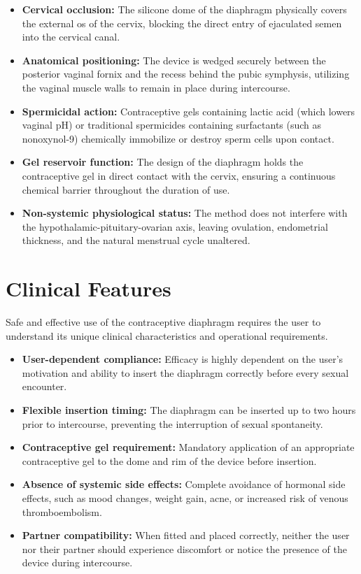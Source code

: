 \begin{itemize}
    \item \textbf{Cervical occlusion:} The silicone dome of the diaphragm physically covers the external os of the cervix, blocking the direct entry of ejaculated semen into the cervical canal.
    \item \textbf{Anatomical positioning:} The device is wedged securely between the posterior vaginal fornix and the recess behind the pubic symphysis, utilizing the vaginal muscle walls to remain in place during intercourse.
    \item \textbf{Spermicidal action:} Contraceptive gels containing lactic acid (which lowers vaginal pH) or traditional spermicides containing surfactants (such as nonoxynol-9) chemically immobilize or destroy sperm cells upon contact.
    \item \textbf{Gel reservoir function:} The design of the diaphragm holds the contraceptive gel in direct contact with the cervix, ensuring a continuous chemical barrier throughout the duration of use.
    \item \textbf{Non-systemic physiological status:} The method does not interfere with the hypothalamic-pituitary-ovarian axis, leaving ovulation, endometrial thickness, and the natural menstrual cycle unaltered.
\end{itemize}

\section*{Clinical Features}
Safe and effective use of the contraceptive diaphragm requires the user to understand its unique clinical characteristics and operational requirements.

\begin{itemize}
    \item \textbf{User-dependent compliance:} Efficacy is highly dependent on the user's motivation and ability to insert the diaphragm correctly before every sexual encounter.
    \item \textbf{Flexible insertion timing:} The diaphragm can be inserted up to two hours prior to intercourse, preventing the interruption of sexual spontaneity.
    \item \textbf{Contraceptive gel requirement:} Mandatory application of an appropriate contraceptive gel to the dome and rim of the device before insertion.
    \item \textbf{Absence of systemic side effects:} Complete avoidance of hormonal side effects, such as mood changes, weight gain, acne, or increased risk of venous thromboembolism.
    \item \textbf{Partner compatibility:} When fitted and placed correctly, neither the user nor their partner should experience discomfort or notice the presence of the device during intercourse.
\end{itemize}

